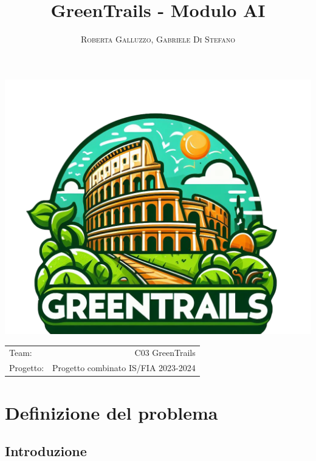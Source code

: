 \documentclass{CSUniSchoolLabReport}
\title{GreenTrails - Modulo AI}
\author{\textsc{Roberta Galluzzo}, \textsc{Gabriele Di Stefano}}
\begin{document}
\maketitle

\begin{center}
	\includegraphics[scale=0.2]{logo}
\end{center}

\begin{center}
	\begin{tabular}{l r}
		Team: & C03 GreenTrails \\
		Progetto: & Progetto combinato IS/FIA 2023-2024
	\end{tabular}
\end{center}

\pagebreak

\tableofcontents

\pagebreak

\section{Definizione del problema}
\subsection{Introduzione}
\end{document}
